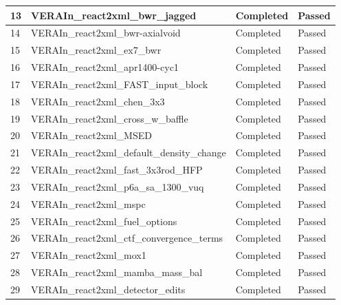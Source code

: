 \begin{longtable}[!ht]{|p{0.75cm}|p{11.25cm}|p{1.6cm}|p{1.1cm}|}
\rowcolor{caslcolor1}\small 13 & \small VERAIn\_react2xml\_bwr\_jagged & \small Completed & \small Passed \\\hline
\rowcolor{caslcolor2}\small 14 & \small VERAIn\_react2xml\_bwr-axialvoid & \small Completed & \small Passed \\\hline
\rowcolor{caslcolor1}\small 15 & \small VERAIn\_react2xml\_ex7\_bwr & \small Completed & \small Passed \\\hline
\rowcolor{caslcolor2}\small 16 & \small VERAIn\_react2xml\_apr1400-cyc1 & \small Completed & \small Passed \\\hline
\rowcolor{caslcolor1}\small 17 & \small VERAIn\_react2xml\_FAST\_input\_block & \small Completed & \small Passed \\\hline
\rowcolor{caslcolor2}\small 18 & \small VERAIn\_react2xml\_chen\_3x3 & \small Completed & \small Passed \\\hline
\rowcolor{caslcolor1}\small 19 & \small VERAIn\_react2xml\_cross\_w\_baffle & \small Completed & \small Passed \\\hline
\rowcolor{caslcolor2}\small 20 & \small VERAIn\_react2xml\_MSED & \small Completed & \small Passed \\\hline
\rowcolor{caslcolor1}\small 21 & \small VERAIn\_react2xml\_default\_density\_change & \small Completed & \small Passed \\\hline
\rowcolor{caslcolor2}\small 22 & \small VERAIn\_react2xml\_fast\_3x3rod\_HFP & \small Completed & \small Passed \\\hline
\rowcolor{caslcolor1}\small 23 & \small VERAIn\_react2xml\_p6a\_sa\_1300\_vuq & \small Completed & \small Passed \\\hline
\rowcolor{caslcolor2}\small 24 & \small VERAIn\_react2xml\_mspc & \small Completed & \small Passed \\\hline
\rowcolor{caslcolor1}\small 25 & \small VERAIn\_react2xml\_fuel\_options & \small Completed & \small Passed \\\hline
\rowcolor{caslcolor2}\small 26 & \small VERAIn\_react2xml\_ctf\_convergence\_terms & \small Completed & \small Passed \\\hline
\rowcolor{caslcolor1}\small 27 & \small VERAIn\_react2xml\_mox1 & \small Completed & \small Passed \\\hline
\rowcolor{caslcolor2}\small 28 & \small VERAIn\_react2xml\_mamba\_mass\_bal & \small Completed & \small Passed \\\hline
\rowcolor{caslcolor1}\small 29 & \small VERAIn\_react2xml\_detector\_edits & \small Completed & \small Passed \\\hline

\end{longtable}
